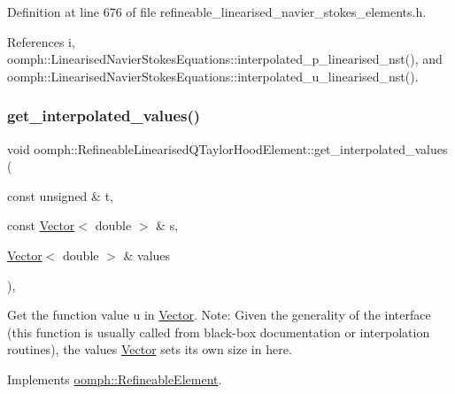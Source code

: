Definition at line 676 of file refineable\+\_\+linearised\+\_\+navier\+\_\+stokes\+\_\+elements.\+h.



References i, oomph\+::\+Linearised\+Navier\+Stokes\+Equations\+::interpolated\+\_\+p\+\_\+linearised\+\_\+nst(), and oomph\+::\+Linearised\+Navier\+Stokes\+Equations\+::interpolated\+\_\+u\+\_\+linearised\+\_\+nst().

\mbox{\label{classoomph_1_1RefineableLinearisedQTaylorHoodElement_abcb292a51258b089db4004d6ac3769f1}} 
\subsubsection{\texorpdfstring{get\+\_\+interpolated\+\_\+values()}{get\_interpolated\_values()}\hspace{0.1cm}{\footnotesize\ttfamily [2/2]}}
{\footnotesize\ttfamily void oomph\+::\+Refineable\+Linearised\+Q\+Taylor\+Hood\+Element\+::get\+\_\+interpolated\+\_\+values (\begin{DoxyParamCaption}\item[{const unsigned \&}]{t,  }\item[{const \hyperlink{classoomph_1_1Vector}{Vector}$<$ double $>$ \&}]{s,  }\item[{\hyperlink{classoomph_1_1Vector}{Vector}$<$ double $>$ \&}]{values }\end{DoxyParamCaption})\hspace{0.3cm}{\ttfamily [inline]}, {\ttfamily [virtual]}}



Get the function value u in \hyperlink{classoomph_1_1Vector}{Vector}. Note\+: Given the generality of the interface (this function is usually called from black-\/box documentation or interpolation routines), the values \hyperlink{classoomph_1_1Vector}{Vector} sets its own size in here. 



Implements \hyperlink{classoomph_1_1RefineableElement_ada6f0efe831ffefb1d2829ce01d45bfc}{oomph\+::\+Refineable\+Element}.



